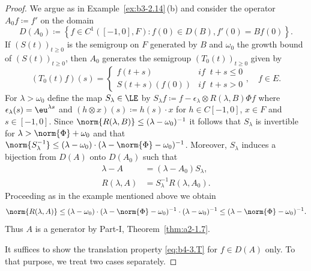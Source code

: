 \begin{proof} 
We argue as in Example~\ref{ex:b3-2.14}\,(b) and consider the operator $A_{0}f  \coloneq  f'$ on the domain 
\[
D(A_{0})  \coloneq  \left\{f \in C^1([-1,0],F) \colon f(0) \in D(B), f'(0) = Bf(0)\right\} .
\]
If\/ $(S(t))_{t\geq 0}$ is the semigroup on $F$ generated by $B$ and $\omega_0$ the growth bound of\/ $(S(t))_{t\geq 0}$, then $A_{0}$ generates the semigroup $(T_{0}(t))_{t\geq 0}$ given by
\[
(T_{0}(t)f)(s) = \begin{cases}
	f(t+s) & \textit{if } \ t+s \leq 0 \\
	S(t+s)(f(0)) & \textit{if } \ t+s  >  0
\end{cases}, \quad f \in E .
\]
For $\lambda  >  \omega_0$ define the map $S_{\lambda} \in \LE$ by $S_{\lambda}f  \coloneq  f - \epsilon_{\lambda}\otimes R(\lambda,B)\Phi f$ where $\epsilon_{\lambda}(s) = \eu^{\lambda s}$ and $(h\otimes x)(s)  \coloneq  h(s)\cdot x$ for $h \in C[-1,0]$, $x \in F$ and $s \in [-1,0]$.
Since $\norm{R(\lambda,B)} \leq (\lambda-\omega_0)^{-1}$ it follows that $S_{\lambda}$ is invertible for $\lambda  >  \norm{\Phi} + \omega_0$ and that $\norm{S_{\lambda}^{-1}} \leq (\lambda-\omega_0)\cdot(\lambda-\norm{\Phi}-\omega_0)^{-1}$.
Moreover, $S_{\lambda}$ induces a bijection from $D(A)$ onto $D(A_{0})$ such that
\begin{equation}\label{eq:b4-3.2}
	\begin{aligned}
		\lambda - A &= (\lambda - A_{0})S_{\lambda} , \\
		R(\lambda,A) &= S_{\lambda}^{-1}R(\lambda,A_{0}) .
	\end{aligned}
\end{equation}
Proceeding as in the example mentioned above we obtain
\[\norm{R(\lambda,A)} \leq (\lambda - \omega_0)\cdot(\lambda - \norm{\Phi} - \omega_0)^{-1}\cdot(\lambda - \omega_0)^{-1} \leq (\lambda - \norm{\Phi} - \omega_0)^{-1}.\]
Thus $A$ is a generator by Part-I, Theorem~\ref{thm:a2-1.7}.

It suffices to show the translation property \eqref{eq:b4-3.T} for $f \in D(A)$ only.
To that purpose, we treat two cases separately.


\end{proof}
